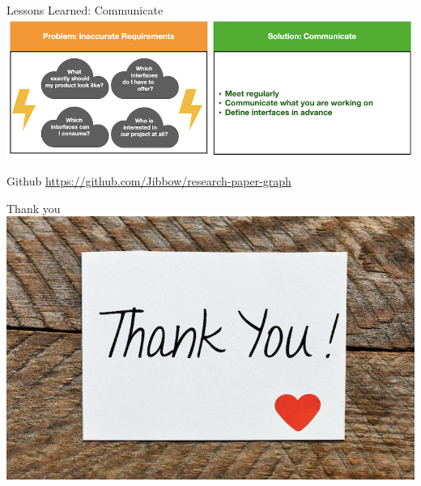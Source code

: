 \documentclass{beamer}
\begin{document}
\begin{frame}{Lessons Learned: Communicate}
    \includegraphics{img_12.png}
\end{frame}

\begin{frame}{Github}
    \url{https://github.com/Jibbow/research-paper-graph}
\end{frame}

\begin{frame}{Thank you}
    \includegraphics{img_05.png}
\end{frame}
\end{document}
